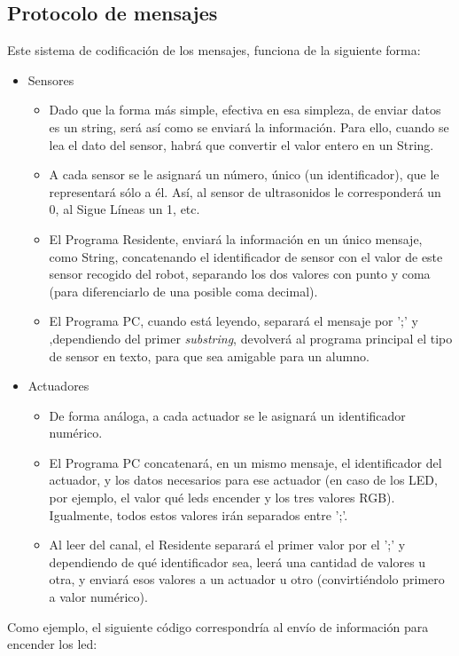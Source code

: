 \subsection{Protocolo de mensajes}
Este sistema de codificación de los mensajes, funciona de la siguiente forma:
\begin{itemize}
	\item Sensores
	\begin{itemize}			
	\item Dado que la forma más simple, efectiva en esa simpleza, de enviar datos es un string, será así como se enviará la información. Para ello, cuando se lea el dato del sensor, habrá que convertir el valor entero en un String. 
	\item A cada sensor se le asignará un número, único (un identificador), que le representará sólo a él. Así, al sensor de ultrasonidos le corresponderá un 0, al Sigue Líneas un 1, etc. 
	\item El Programa Residente, enviará la información en un único mensaje, como String, concatenando el identificador de sensor con el valor de este sensor recogido del robot, separando los dos valores con punto y coma (para diferenciarlo de una posible coma decimal).
	\item El Programa PC, cuando está leyendo, separará el mensaje por ';' y ,dependiendo del primer \textit{substring}, devolverá al programa principal el tipo de sensor en texto, para que sea amigable para un alumno. 
    \end{itemize}

\item Actuadores
\begin{itemize}
	\item De forma análoga, a cada actuador se le asignará un identificador numérico.
	\item El Programa PC concatenará, en un mismo mensaje, el identificador del actuador, y los datos necesarios para ese actuador (en caso de los LED, por ejemplo, el valor qué leds encender y los tres valores RGB). Igualmente, todos estos valores irán separados entre ';'.
	\item Al leer del canal, el Residente separará el primer valor por el ';' y dependiendo de qué identificador sea, leerá una cantidad de valores u otra, y enviará esos valores a un actuador u otro (convirtiéndolo primero a valor numérico).
\end{itemize}
\end{itemize}

Como ejemplo, el siguiente código correspondría al envío de información para encender los led:

